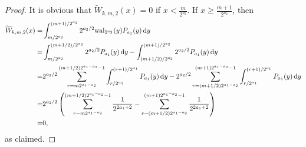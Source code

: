\documentclass[namedate,webpdf,imanum]{ima-authoring-arxiv}%
\theoremstyle{thmstyletwo}%
\numberwithin{equation}{section}
\newcommand{\rd}{\, {\rm d}}
\newcommand{\wal}{{\rm wal}}
\begin{document}
\begin{appendix}
\begin{proof}
It is obvious that $\widetilde{W}_{k,m,2}(x)=0$ if $x < \frac{m}{2^{a_2}}$. If $x \ge \frac{m+1}{2^{a_2}}$, then
\begin{align*}
\widetilde{W}_{k,m,2}(x) = & \int_{m/2^{a_2}}^{(m+1)/2^{a_2}} 2^{a_2/2} \wal_{2^{a_2}}(y) P_{a_1}(y)\rd y\\
= & \int_{m/2^{a_2}}^{(m+1/2)/2^{a_2}} 2^{a_2/2} P_{a_1}(y)\rd y - \int_{(m+1/2)/2^{a_2}}^{(m+1)/2^{a_2}} 2^{a_2/2} P_{a_1}(y)\rd y \\
= & 2^{a_2/2} \sum_{r=m 2^{a_1-a_2}}^{(m+1/2) 2^{a_1-a_2}-1} \int_{r/2^{a_1}}^{(r+1)/2^{a_1}} P_{a_1}(y)\rd y - 2^{a_2/2} \sum_{r=(m+1/2) 2^{a_1-a_2}}^{(m+1) 2^{a_1-a_2}-1} \int_{r/2^{a_1}}^{(r+1)/2^{a_1}} P_{a_1}(y)\rd y \\
= & 2^{a_2/2} \left(\sum_{r=m 2^{a_1-a_2}}^{(m+1/2) 2^{a_1-a_2}-1} \frac{1}{2^{2a_1+2}} -  \sum_{r=(m+1/2) 2^{a_1-a_2}}^{(m+1) 2^{a_1-a_2}-1} \frac{1}{2^{2a_1+2}}\right)\\
= & 0,
\end{align*}
as claimed.
\end{proof}

\end{appendix}


\end{document}
